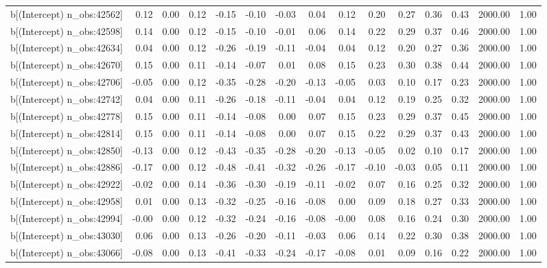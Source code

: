 \begin{table}[ht]
\begin{tabular}{rrrrrrrrrrrrrrr}
  b[(Intercept) n\_obs:42562] & 0.12 & 0.00 & 0.12 & -0.15 & -0.10 & -0.03 & 0.04 & 0.12 & 0.20 & 0.27 & 0.36 & 0.43 & 2000.00 & 1.00 \\ 
  b[(Intercept) n\_obs:42598] & 0.14 & 0.00 & 0.12 & -0.15 & -0.10 & -0.01 & 0.06 & 0.14 & 0.22 & 0.29 & 0.37 & 0.46 & 2000.00 & 1.00 \\ 
  b[(Intercept) n\_obs:42634] & 0.04 & 0.00 & 0.12 & -0.26 & -0.19 & -0.11 & -0.04 & 0.04 & 0.12 & 0.20 & 0.27 & 0.36 & 2000.00 & 1.00 \\ 
  b[(Intercept) n\_obs:42670] & 0.15 & 0.00 & 0.11 & -0.14 & -0.07 & 0.01 & 0.08 & 0.15 & 0.23 & 0.30 & 0.38 & 0.44 & 2000.00 & 1.00 \\ 
  b[(Intercept) n\_obs:42706] & -0.05 & 0.00 & 0.12 & -0.35 & -0.28 & -0.20 & -0.13 & -0.05 & 0.03 & 0.10 & 0.17 & 0.23 & 2000.00 & 1.00 \\ 
  b[(Intercept) n\_obs:42742] & 0.04 & 0.00 & 0.11 & -0.26 & -0.18 & -0.11 & -0.04 & 0.04 & 0.12 & 0.19 & 0.25 & 0.32 & 2000.00 & 1.00 \\ 
  b[(Intercept) n\_obs:42778] & 0.15 & 0.00 & 0.11 & -0.14 & -0.08 & 0.00 & 0.07 & 0.15 & 0.23 & 0.29 & 0.37 & 0.45 & 2000.00 & 1.00 \\ 
  b[(Intercept) n\_obs:42814] & 0.15 & 0.00 & 0.11 & -0.14 & -0.08 & 0.00 & 0.07 & 0.15 & 0.22 & 0.29 & 0.37 & 0.43 & 2000.00 & 1.00 \\ 
  b[(Intercept) n\_obs:42850] & -0.13 & 0.00 & 0.12 & -0.43 & -0.35 & -0.28 & -0.20 & -0.13 & -0.05 & 0.02 & 0.10 & 0.17 & 2000.00 & 1.00 \\ 
  b[(Intercept) n\_obs:42886] & -0.17 & 0.00 & 0.12 & -0.48 & -0.41 & -0.32 & -0.26 & -0.17 & -0.10 & -0.03 & 0.05 & 0.11 & 2000.00 & 1.00 \\ 
  b[(Intercept) n\_obs:42922] & -0.02 & 0.00 & 0.14 & -0.36 & -0.30 & -0.19 & -0.11 & -0.02 & 0.07 & 0.16 & 0.25 & 0.32 & 2000.00 & 1.00 \\ 
  b[(Intercept) n\_obs:42958] & 0.01 & 0.00 & 0.13 & -0.32 & -0.25 & -0.16 & -0.08 & 0.00 & 0.09 & 0.18 & 0.27 & 0.33 & 2000.00 & 1.00 \\ 
  b[(Intercept) n\_obs:42994] & -0.00 & 0.00 & 0.12 & -0.32 & -0.24 & -0.16 & -0.08 & -0.00 & 0.08 & 0.16 & 0.24 & 0.30 & 2000.00 & 1.00 \\ 
  b[(Intercept) n\_obs:43030] & 0.06 & 0.00 & 0.13 & -0.26 & -0.20 & -0.11 & -0.03 & 0.06 & 0.14 & 0.22 & 0.30 & 0.38 & 2000.00 & 1.00 \\ 
  b[(Intercept) n\_obs:43066] & -0.08 & 0.00 & 0.13 & -0.41 & -0.33 & -0.24 & -0.17 & -0.08 & 0.01 & 0.09 & 0.16 & 0.22 & 2000.00 & 1.00 \\ 

\end{tabular}
\end{table}
